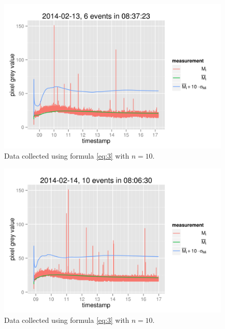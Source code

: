 \documentclass[a4paper,12pt]{article}
\begin{document}
\begin{figure}[h!]
  \centering
  \includegraphics{20140213.png}
  \caption{Data collected using formula \ref{eq:3} with $n=10$.}
\end{figure}

\begin{figure}[h!]
  \centering
  \includegraphics{20140214.png}
  \caption{Data collected using formula \ref{eq:3} with $n=10$.}\label{fig:2}
\end{figure}
\end{document}
